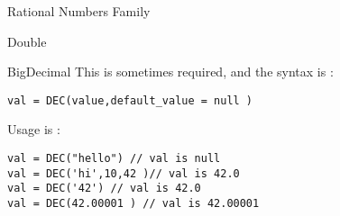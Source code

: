 \begin{section}{Rational Numbers Family}
\begin{subsection}{Double}
\end{subsection}

\begin{subsection}{BigDecimal}
This is sometimes required, and the syntax is :

\begin{lstlisting}[style=JexlStyle]
val = DEC(value,default_value = null )
\end{lstlisting}

Usage is :
\begin{center}\begin{minipage}{\linewidth}
\begin{lstlisting}[style=JexlStyle]
val = DEC("hello") // val is null
val = DEC('hi',10,42 )// val is 42.0
val = DEC('42') // val is 42.0 
val = DEC(42.00001 ) // val is 42.00001
\end{lstlisting}
\end{minipage}\end{center}
\end{subsection}

\end{section}

